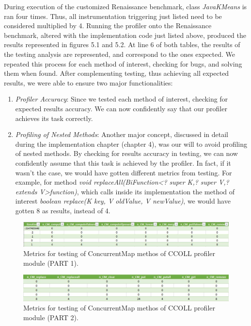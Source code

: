 \documentclass[]{usiinfthesis}
\begin{document}
During execution of the customized Renaissance benchmark, class \textit{JavaKMeans} is ran four times. Thus, all instrumentation triggering just listed need to be considered multiplied by 4. Running the profiler onto the Renaissance benchmark, altered with the implementation code just listed above, produced the results represented in figures 5.1 and 5.2. At line 6 of both tables, the results of the testing analysis are represented, and correspond to the ones expected.
\newline \newline
We repeated this process for each method of interest, checking for bugs, and solving them when found. After complementing testing, thus achieving all expected results, we were able to ensure two major functionalities:
\begin{enumerate}
    \item \textit{Profiler Accuracy}: Since we tested each method of interest, checking for expected results accuracy. We can now confidently say that our profiler achieves its task correctly.    \item \textit{Profiling of Nested Methods}: Another major concept, discussed in detail during the implementation chapter (chapter 4), was our will to avoid profiling of nested methods. By checking for results accuracy in testing, we can now confidently assume that this task is achieved by the profiler. In fact, if it wasn't the case, we would have gotten different metrics from testing. For example, for method \textit{void replaceAll(BiFunction<? super K,? super V,? extends V>function)}, which calls inside its implementation the method of interest \textit{boolean replace(K key, V oldValue, V newValue)}, we would have gotten 8 as results, instead of 4.
\end{enumerate}


    \vspace{0.5cm}
\begin{figure}[h]
    \centering
    \includegraphics[scale=0.5]{Immagini/testing.JPG} 
    \caption{Metrics for testing of ConcurrentMap methos of CCOLL profiler module (PART 1).}
    \label{fig:fig1}
\end{figure}
\begin{figure}[h]
    \centering
    \includegraphics[scale=0.5]{Immagini/testing2.JPG} 
    \caption{Metrics for testing of ConcurrentMap methos of CCOLL profiler module (PART 2).}
    \label{fig:fig1}
\end{figure}
\end{document}
